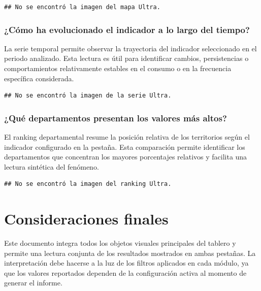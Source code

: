 \documentclass[
]{article}
\begin{document}
\begin{verbatim}
## No se encontró la imagen del mapa Ultra.
\end{verbatim}

\subsubsection{¿Cómo ha evolucionado el indicador a lo largo del
tiempo?}\label{cuxf3mo-ha-evolucionado-el-indicador-a-lo-largo-del-tiempo-1}

La serie temporal permite observar la trayectoria del indicador
seleccionado en el periodo analizado. Esta lectura es útil para
identificar cambios, persistencias o comportamientos relativamente
estables en el consumo o en la frecuencia específica considerada.

\begin{verbatim}
## No se encontró la imagen de la serie Ultra.
\end{verbatim}

\subsubsection{¿Qué departamentos presentan los valores más
altos?}\label{quuxe9-departamentos-presentan-los-valores-muxe1s-altos}

El ranking departamental resume la posición relativa de los territorios
según el indicador configurado en la pestaña. Esta comparación permite
identificar los departamentos que concentran los mayores porcentajes
relativos y facilita una lectura sintética del fenómeno.

\begin{verbatim}
## No se encontró la imagen del ranking Ultra.
\end{verbatim}

\section{Consideraciones finales}\label{consideraciones-finales}

Este documento integra todos los objetos visuales principales del
tablero y permite una lectura conjunta de los resultados mostrados en
ambas pestañas. La interpretación debe hacerse a la luz de los filtros
aplicados en cada módulo, ya que los valores reportados dependen de la
configuración activa al momento de generar el informe.
\end{document}
